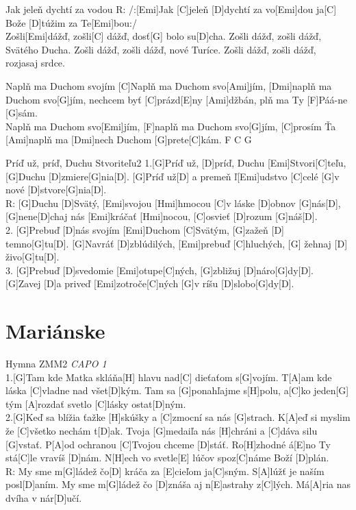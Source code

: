 \documentclass[12pt]{article}
\begin{document}
\begin{songgroup}{2}
	\begin{groupitem}{Jak jeleň dychtí za vodou}	
		R: /:[Emi]Jak [C]jeleň [D]dychtí za vo[Emi]dou
		ja[C] Bože [D]túžim za Te[Emi]bou:/
		\\
		Zošli[Emi]dážď, zošli[C] dážď, dosť[G] bolo su[D]cha.
		Zošli dážď, zošli dážď, Svätého Ducha.
		Zošli dážď, zošli dážď, nové Turíce.
		Zošli dážď, zošli dážď, rozjasaj srdce.
	\end{groupitem}
	\columnbreak
	\begin{groupitem}{Naplň ma Duchom svojím}
		[C]Naplň ma Duchom svo[Ami]jím, 
		[Dmi]naplň ma Duchom svo[G]jím,
		nechcem byť [C]prázd[E]ny [Ami]džbán, 
		plň ma Ty [F]Páá-ne [G]sám.
		\\
		[Ami]Naplň ma Duchom svo[Emi]jím, 
		[F]naplň ma Duchom svo[G]jím,
		[C]prosím Ťa [Ami]naplň ma 
		[Dmi]nech Duchom [G]prete[C]kám. F C G
	\end{groupitem}
\end{songgroup}

\begin{song}{Príď už, príď, Duchu Stvoriteľu}{2}
	1.[G]Príď už, [D]príď, Duchu [Emi]Stvori[C]teľu, [G]Duchu [D]zmiere[G]nia[D].
	[G]Príď už[D] a premeň ľ[Emi]udstvo [C]celé [G]v nové [D]stvore[G]nia[D].
	\\
	R: [G]Duchu [D]Svätý, [Emi]svojou [Hmi]hmocou [C]v láske [D]obnov [G]nás[D],
	[G]nene[D]chaj nás [Emi]kráčať [Hmi]nocou, [C]osvieť [D]rozum [G]náš[D].
	\\
	2. [G]Prebuď [D]nás svojím [Emi]Duchom [C]Svätým, [G]zažeň [D] temno[G]tu[D].
	[G]Navráť [D]zblúdilých, [Emi]prebuď [C]hluchých, [G] žehnaj [D] živo[G]tu[D].
	\\
	3. [G]Prebuď [D]svedomie [Emi]otupe[C]ných, [G]zbližuj [D]náro[G]dy[D].
	[G]Zavej [D]a priveď [Emi]zotroče[C]ných [G]v ríšu [D]slobo[G]dy[D].
	\columnbreak
\end{song}

\newpage
\section{Mariánske}

\begin{song}{Hymna ZMM}{2}
	\textit{CAPO 1}\\
	1.[G]Tam kde Matka skláňa[H] hlavu nad[C] dieťaťom s[G]vojím.
	T[A]am kde láska [C]vladne nad všet[D]kým.
	Tam sa [G]ponahľajme s[H]polu, a[C]ko jeden[G] tým
	[A]rozdať svetlo [C]lásky ostat[D]ným.
	\\
	2.[G]Keď sa blížia ťažke [H]skúšky a [C]zmocní sa nás [G]strach.
	K[A]eď si myslim že [C]všetko nechám t[D]ak.
	Tvoja [G]medaiľa nás [H]chráni a [C]dáva silu [G]vstať.
	P[A]od ochranou [C]Tvojou chceme [D]stáť.
	\columnbreak
	Ro[H]zhodné á[E]no Ty stá[C]le vravíš [D]nám.
	N[H]ech vo svetle[E] lúčov spoz[C]náme Boží [D]plán.
	\\
	R: My sme m[G]ládež čo[D] kráča
	za [E]cieľom ja[C]sným.
	S[A]lúžť je naším posl[D]aním.
	My sme m[G]ládež čo [D]znáša 
	aj n[E]astrahy z[C]lých.
	Má[A]ria nas dvíha v nár[D]učí.
\end{song}
\end{document}
